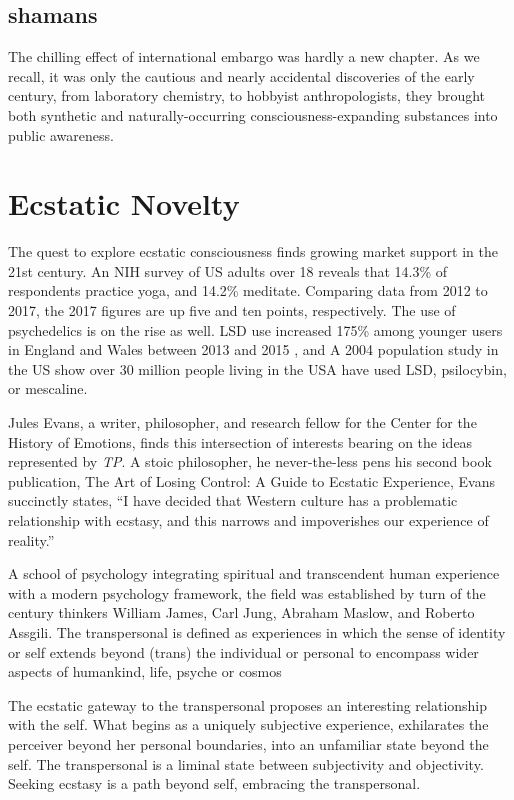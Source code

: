 \documentclass{UIdahoMastersThesis}
\begin{document}
\subsection{shamans}

The chilling effect of international embargo was hardly a new chapter. As we recall, it was only the cautious and nearly accidental discoveries of the early  century, from laboratory chemistry, to hobbyist anthropologists, they brought both synthetic and naturally-occurring consciousness-expanding substances into public awareness. 

\section{Ecstatic Novelty}

The quest to explore ecstatic consciousness finds growing market support in the 21st century. An NIH survey of US adults over 18 reveals that 14.3\% of respondents practice yoga, and 14.2\% meditate.  Comparing data from 2012 to 2017, the 2017 figures are up five and ten points, respectively. The use of psychedelics is on the rise as well. LSD use increased 175\% among younger users in England and Wales between 2013 and 2015 \cite{gayle_ecstasy_2015}, and A 2004 population study in the US show over 30 million people living in the USA have used LSD, psilocybin, or mescaline. \cite{krebs_psychedelics_2013}

Jules Evans, a writer, philosopher, and research fellow for the Center for the History of Emotions, finds this intersection of interests bearing on the ideas represented by \textit{\ac{TP}}. A stoic philosopher, he never-the-less pens his second book publication, The Art of Losing Control: A Guide to Ecstatic Experience, Evans succinctly states, \enquote{I have decided that Western culture has a problematic relationship with ecstasy, and this narrows and impoverishes our experience of reality.}

A school of psychology integrating spiritual and transcendent human experience with a modern psychology framework, the field was established by turn of the century thinkers William James, Carl Jung, Abraham Maslow, and Roberto Assgili. The transpersonal is defined as experiences in which the sense of identity or self extends beyond (trans) the individual or personal to encompass wider aspects of humankind, life, psyche or cosmos \cite{calijornia1993transpersonal}

The ecstatic gateway to the transpersonal proposes an interesting relationship with the self. What begins as a uniquely subjective experience, exhilarates the perceiver beyond her personal boundaries, into an unfamiliar state beyond the self. The transpersonal is a liminal state between subjectivity and objectivity. Seeking ecstasy is a path beyond self, embracing the transpersonal.
\end{document}
